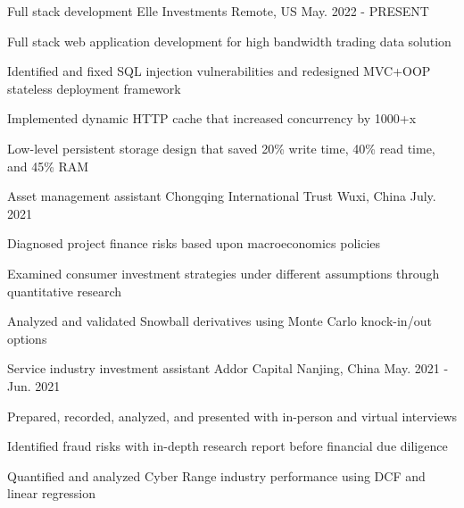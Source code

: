 \begin{cventries}
  \cventry
    {Full stack development}
    {Elle Investments}
    {Remote, US}
    {May. 2022 - PRESENT}
    {
      \begin{cvitems}
        \item {Full stack web application development for high bandwidth trading data solution}
        \item {Identified and fixed SQL injection vulnerabilities and redesigned MVC+OOP stateless deployment framework}
        \item {Implemented dynamic HTTP cache that increased concurrency by 1000+x}
        \item {Low-level persistent storage design that saved 20\% write time, 40\% read time, and 45\% RAM}
      \end{cvitems}
    }

  \cventry
    {Asset management assistant}
    {Chongqing International Trust}
    {Wuxi, China}
    {July. 2021}
    {
      \begin{cvitems}
        \item {Diagnosed project finance risks based upon macroeconomics policies}
        \item {Examined consumer investment strategies under different assumptions through quantitative research}
        \item {Analyzed and validated Snowball derivatives using Monte Carlo knock-in/out options}
      \end{cvitems}
    }

  \cventry
    {Service industry investment assistant}
    {Addor Capital}
    {Nanjing, China}
    {May. 2021 - Jun. 2021}
    {
      \begin{cvitems}
        \item {Prepared, recorded, analyzed, and presented with in-person and virtual interviews }
        \item {Identified fraud risks with in-depth research report before financial due diligence}
        \item {Quantified and analyzed Cyber Range industry performance using DCF and linear regression}
      \end{cvitems}
    }


\end{cventries}
